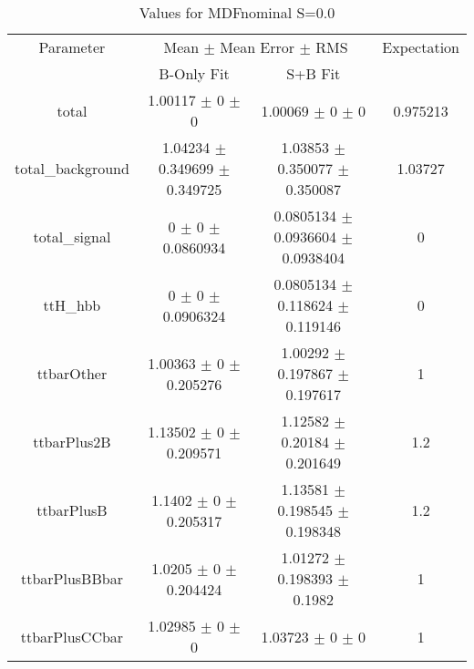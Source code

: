 \begin{table}
\centering
\caption{Values for MDFnominal S=0.0}
\begin{tabular}{cccc}
\toprule
Parameter & \multicolumn{2}{c}{Mean $\pm$ Mean Error $\pm$ RMS} & Expectation\\
 & B-Only Fit & S+B Fit & \\
\midrule
total & \num{1.00117} $\pm$ \num{0} $\pm$ \num{0} & \num{1.00069} $\pm$ \num{0} $\pm$ \num{0} & \num{0.975213}\\
total\_background & \num{1.04234} $\pm$ \num{0.349699} $\pm$ \num{0.349725} & \num{1.03853} $\pm$ \num{0.350077} $\pm$ \num{0.350087} & \num{1.03727}\\
total\_signal & \num{0} $\pm$ \num{0} $\pm$ \num{0.0860934} & \num{0.0805134} $\pm$ \num{0.0936604} $\pm$ \num{0.0938404} & \num{0}\\
ttH\_hbb & \num{0} $\pm$ \num{0} $\pm$ \num{0.0906324} & \num{0.0805134} $\pm$ \num{0.118624} $\pm$ \num{0.119146} & \num{0}\\
ttbarOther & \num{1.00363} $\pm$ \num{0} $\pm$ \num{0.205276} & \num{1.00292} $\pm$ \num{0.197867} $\pm$ \num{0.197617} & \num{1}\\
ttbarPlus2B & \num{1.13502} $\pm$ \num{0} $\pm$ \num{0.209571} & \num{1.12582} $\pm$ \num{0.20184} $\pm$ \num{0.201649} & \num{1.2}\\
ttbarPlusB & \num{1.1402} $\pm$ \num{0} $\pm$ \num{0.205317} & \num{1.13581} $\pm$ \num{0.198545} $\pm$ \num{0.198348} & \num{1.2}\\
ttbarPlusBBbar & \num{1.0205} $\pm$ \num{0} $\pm$ \num{0.204424} & \num{1.01272} $\pm$ \num{0.198393} $\pm$ \num{0.1982} & \num{1}\\
ttbarPlusCCbar & \num{1.02985} $\pm$ \num{0} $\pm$ \num{0} & \num{1.03723} $\pm$ \num{0} $\pm$ \num{0} & \num{1}\\
\bottomrule
\end{tabular}
\end{table}